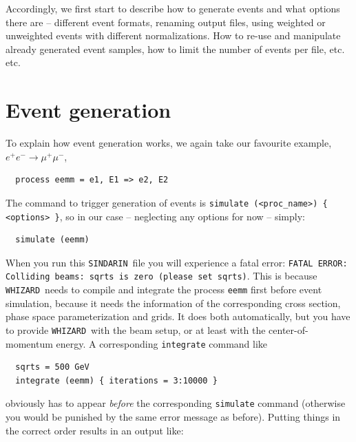 \documentclass[12pt]{book}
\newcommand{\ttt}[1]{\texttt{#1}}
\newcommand{\whizard}{\ttt{WHIZARD}}
\newcommand{\sindarin}{\ttt{SINDARIN}}
\begin{document}
Accordingly, we first start to describe how to generate events and
what options there are -- different event formats, renaming output
files, using weighted or unweighted events with different
normalizations. How to re-use and manipulate already generated event
samples, how to limit the number of events per file, etc. etc.

\section{Event generation}

To explain how event generation works, we again take our favourite
example, $e^+e^- \to \mu^+ \mu^-$,
\begin{verbatim}
  process eemm = e1, E1 => e2, E2
\end{verbatim}
The command to trigger generation of events is \ttt{simulate
  (<proc\_name>) \{ <options> \}}, so in our case -- neglecting any
options for now -- simply:
\begin{verbatim}
  simulate (eemm)
\end{verbatim}
When you run this \sindarin\ file you will experience a fatal error:
\ttt{FATAL ERROR: Colliding beams: sqrts is zero (please set
sqrts)}. This is because \whizard\ needs to compile and integrate the
process \ttt{eemm} first before event simulation, because it needs the
information of the corresponding cross section, phase space
parameterization and grids. It does both automatically, but you have
to provide \whizard\ with the beam setup, or at least with the
center-of-momentum energy.  A corresponding \ttt{integrate} command
like
\begin{verbatim}
  sqrts = 500 GeV
  integrate (eemm) { iterations = 3:10000 }
\end{verbatim}
obviously has to appear {\em before} the corresponding \ttt{simulate}
command (otherwise you would be punished by the same error message as
before). Putting things in the correct order results in an output
like:
\end{document}
